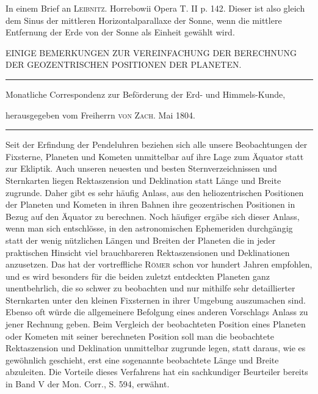 \expandafter\def\csname HistoricalNoteText4\endcsname{In einem Brief an \textsc{Leibnitz}. Horrebowii Opera T. II p. 142.}
\expandafter\def\csname HistoricalNoteText5\endcsname{Dieser ist also gleich dem Sinus der mittleren Horizontalparallaxe der Sonne, wenn die mittlere
Entfernung der Erde von der Sonne als Einheit gewählt wird.}
\clearpage{}%
\begin{center}
{\small EINIGE BEMERKUNGEN ZUR VEREINFACHUNG DER BERECHNUNG
DER GEOZENTRISCHEN POSITIONEN DER PLANETEN.\par}
\medskip\hrule\medskip
{\small Monatliche Correspondenz zur Beförderung der Erd- und Himmels-Kunde,\par
herausgegeben vom Freiherrn \textsc{von Zach}. Mai 1804.\par}
\medskip\hrule
\end{center}\medskip
Seit der Erfindung der Pendeluhren beziehen sich alle unsere Beobachtungen
der Fixsterne, Planeten und Kometen unmittelbar auf ihre Lage zum Äquator
statt zur Ekliptik. Auch unseren neuesten und besten Sternverzeichnissen und
Sternkarten liegen Rektaszension und Deklination statt Länge und Breite zugrunde.
Daher gibt es sehr häufig Anlass, aus den heliozentrischen Positionen der Planeten
und Kometen in ihren Bahnen ihre geozentrischen Positionen in Bezug auf den
Äquator zu berechnen. Noch häufiger ergäbe sich dieser Anlass, wenn man sich
entschlösse, in den astronomischen Ephemeriden durchgängig statt der wenig
nützlichen Längen und Breiten der Planeten die in jeder praktischen Hinsicht
viel brauchbareren Rektaszensionen und Deklinationen anzusetzen. Das hat der
vortreffliche \textsc{Römer} schon vor hundert Jahren empfohlen,
und es wird besonders für die beiden zuletzt entdeckten Planeten ganz
unentbehrlich, die so schwer zu beobachten und nur mithilfe sehr detaillierter
Sternkarten unter den kleinen Fixsternen in ihrer Umgebung auszumachen sind.
Ebenso oft würde die allgemeinere Befolgung eines anderen Vorschlags Anlass zu
jener Rechnung geben. Beim Vergleich der beobachteten Position
%
eines Planeten oder Kometen mit seiner berechneten Position soll man die
beobachtete Rektaszension und Deklination unmittelbar zugrunde legen, statt
daraus, wie es gewöhnlich geschieht, erst eine sogenannte beobachtete Länge
und Breite abzuleiten. Die Vorteile dieses Verfahrens hat ein sachkundiger
Beurteiler bereits in Band V der Mon. Corr., S. 594, erwähnt.


